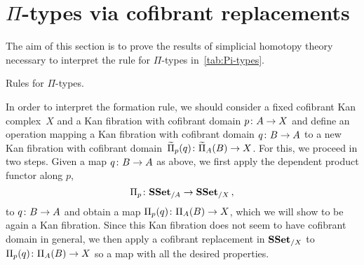 \documentclass[reqno,10pt,a4paper,oneside,draft]{amsart}
\begin{document}
\section{$\Pi$-types via cofibrant replacements}
\label{sec:Pi-types}

The aim of this section is to prove the results of simplicial homotopy theory necessary to interpret
the rule for $\Pi$-types in~\cref{tab:Pi-types}. 

\begin{table}[htb]
\medskip
\caption{Rules for $\Pi$-types.} 
\label{tab:Pi-types}
\end{table}

In order to interpret the formation rule, we should consider a fixed cofibrant Kan complex~$X$ and a Kan fibration with cofibrant domain $p \colon A \to X$  and define an operation mapping a Kan fibration with cofibrant domain $q \colon B \to A$  to a new Kan fibration with cofibrant domain~$\widetilde{\Pi}_p(q) \colon \widetilde{\Pi}_A(B) \to X$. For this, we proceed
in two steps. Given a map $q \colon B \to A$ as above, we first apply the dependent product functor along $p$, 
\[
\Pi_p \colon \mathbf{SSet}_{/A} \to \mathbf{SSet}_{/X} \, , 
\]
to $q \colon B \to A$ and obtain a map $\Pi_p(q) \colon \Pi_A(B) \to X$, which we will show to be again a Kan fibration. Since this Kan fibration does not seem to have  cofibrant domain in general, we then apply a
cofibrant replacement in $\mathbf{SSet}_{/X}$ to $\Pi_p(q) \colon \Pi_A(B) \to X$ so a map with all the desired
properties. 
\end{document}
